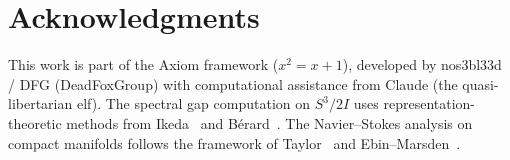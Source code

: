 \documentclass[11pt,a4paper]{article}
\theoremstyle{plain}
\theoremstyle{definition}
\newcommand{\BI}{2I}                      %
\begin{document}
\section*{Acknowledgments}

This work is part of the Axiom framework ($x^2 = x + 1$), developed by
nos3bl33d / DFG (DeadFoxGroup) with computational assistance from Claude
(the quasi-libertarian elf).  The spectral gap computation on $S^3/\BI$ uses
representation-theoretic methods from Ikeda~\cite{Ikeda} and B\'{e}rard~\cite{Berard}.
The Navier--Stokes analysis on compact manifolds follows the framework of
Taylor~\cite{Taylor} and Ebin--Marsden~\cite{EM}.

\end{document}
